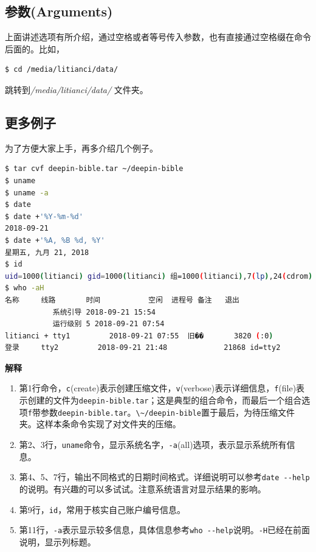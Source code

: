 \documentclass[doctor,openright,twoside]{sjtuthesis}
\providecommand{\tightlist}{%
    \setlength{\itemsep}{0pt}\setlength{\parskip}{0pt}}
\newcommand{\passthrough}[1]{#1}
\theoremstyle{plain}
\theoremstyle{definition}
\theoremstyle{remark}
\theoremstyle{ocrenumbox}
\theoremstyle{plain}
\begin{document}
\hypertarget{arguments}{%
\subsection{参数(Arguments)}\label{arguments}}

上面讲述选项有所介绍，通过空格或者等号传入参数，也有直接通过空格缀在命令后面的。比如，

\begin{lstlisting}[language=bash]
$ cd /media/litianci/data/
\end{lstlisting}

跳转到\emph{/media/litianci/data/} 文件夹。

\hypertarget{shell:more-example}{%
\subsection{更多例子}\label{shell:more-example}}

为了方便大家上手，再多介绍几个例子。

\begin{lstlisting}[language=bash]
$ tar cvf deepin-bible.tar ~/deepin-bible
$ uname
$ uname -a
$ date
$ date +'%Y-%m-%d'
2018-09-21
$ date +'%A, %B %d, %Y'
星期五, 九月 21, 2018
$ id
uid=1000(litianci) gid=1000(litianci) 组=1000(litianci),7(lp),24(cdrom),27(sudo)
$ who -aH
名称     线路       时间           空闲  进程号 备注   退出
           系统引导 2018-09-21 15:54
           运行级别 5 2018-09-21 07:54
litianci + tty1         2018-09-21 07:55  旧��       3820 (:0)
登录     tty2         2018-09-21 21:48             21868 id=tty2
\end{lstlisting}

\textbf{解释}

\begin{enumerate}
\def\labelenumi{\arabic{enumi}.}
\tightlist
\item
  第1行命令，\passthrough{\lstinline!c!}(create)表示创建压缩文件，\passthrough{\lstinline!v!}(verbose)表示详细信息，\passthrough{\lstinline!f!}(file)表示创建的文件为\passthrough{\lstinline!deepin-bible.tar!}；这是典型的组合命令，而最后一个组合选项\passthrough{\lstinline!f!}带参数\passthrough{\lstinline!deepin-bible.tar!}。\passthrough{\lstinline!\~/deepin-bible!}置于最后，为待压缩文件夹。这样本条命令实现了对文件夹的压缩。
\item
  第2、3行，\passthrough{\lstinline!uname!}命令，显示系统名字，\passthrough{\lstinline!-a!}(all)选项，表示显示系统所有信息。
\item
  第4、5、7行，输出不同格式的日期时间格式。详细说明可以参考\passthrough{\lstinline!date --help!}的说明。有兴趣的可以多试试。注意系统语言对显示结果的影响。
\item
  第9行，\passthrough{\lstinline!id!}，常用于核实自己账户编号信息。
\item
  第11行，\passthrough{\lstinline!-a!}表示显示较多信息，具体信息参考\passthrough{\lstinline!who --help!}说明。\passthrough{\lstinline!-H!}已经在前面说明，显示列标题。
\end{enumerate}
\end{document}
